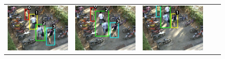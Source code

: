 \begin{frame}
\begin{figure}
\begin{tabular}{ccccc}
            \includegraphics[scale=0.17]{figures/complex-tracking-result-0133} &
            \includegraphics[scale=0.17]{figures/complex-tracking-result-0141} &
            \includegraphics[scale=0.17]{figures/complex-tracking-result-0160} 

\end{tabular}
\end{figure}
\end{frame}
